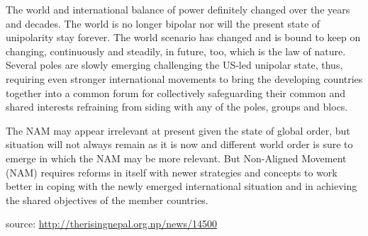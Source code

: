 \documentclass[
  openany]{book}
\begin{document}
The world and international balance of power definitely changed over the years and decades. The world is no longer bipolar nor will the present state of unipolarity stay forever. The world scenario has changed and is bound to keep on changing, continuously and steadily, in future, too, which is the law of nature. Several poles are slowly emerging challenging the US-led unipolar state, thus, requiring even stronger international movements to bring the developing countries together into a common forum for collectively safeguarding their common and shared interests refraining from siding with any of the poles, groups and blocs.

The NAM may appear irrelevant at present given the state of global order, but situation will not always remain as it is now and different world order is sure to emerge in which the NAM may be more relevant. But Non-Aligned Movement (NAM) requires reforms in itself with newer strategies and concepts to work better in coping with the newly emerged international situation and in achieving the shared objectives of the member countries.

source: \url{http://therisingnepal.org.np/news/14500}
\end{document}
